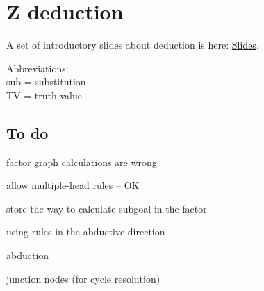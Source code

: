 \chapter{Z deduction}

A set of introductory slides about deduction is here:
\href{http://code.google.com/p/genifer/downloads/list}{Slides}.

Abbreviations:\\
\tab sub = substitution\\
\tab TV = truth value

\section{To do}
\begin{compactenum}
\item factor graph calculations are wrong
  \begin{compactenum}
  \item allow multiple-head rules -- OK
  \item store the way to calculate subgoal in the factor
  \end{compactenum}
\item using rules in the abductive direction
\item abduction
\item junction nodes (for cycle resolution)
\end{compactenum}


